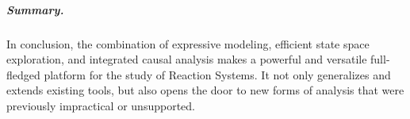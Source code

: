 \subparagraph*{Summary.}
In conclusion, the combination of expressive modeling, efficient state space exploration, and integrated causal analysis makes \GROOVE a powerful and versatile full-fledged platform for the study of Reaction Systems. It not only generalizes and extends existing tools, but also opens the door to new forms of analysis that were previously impractical or unsupported.










